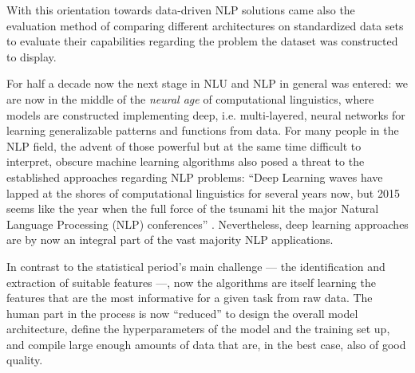 
With this orientation towards data-driven NLP solutions came also the evaluation method
of comparing different architectures on standardized data sets to evaluate their capabilities
regarding the problem the dataset was constructed to display.

For half a decade now the next stage in NLU and NLP in general was entered: we are now in the
middle of the \emph{neural age} of computational linguistics, where models are constructed
implementing deep, i.e. multi-layered, neural networks for learning generalizable patterns and
functions from data. For many people in the NLP field, the advent of those powerful but at
the same time difficult to interpret, obscure machine learning algorithms also posed a threat to
the established approaches regarding NLP problems: ``Deep Learning waves have lapped at the
shores of computational linguistics for several years now, but 2015 seems like the year when
the full force of the tsunami hit the major Natural Language Processing (NLP) conferences''
\citep[p.~701]{manning2015computational}. Nevertheless, deep learning approaches are by now an integral
part of the vast majority NLP applications.

In contrast to the statistical period's main challenge --- the identification and extraction
of suitable features ---, now the algorithms are itself learning the features that are the
most informative for a given task from raw data. The human
part in the process is now ``reduced'' to design the overall model architecture, define the
hyperparameters of the model and the training set up, and compile large enough amounts of
data that are, in the best case, also of good quality.

